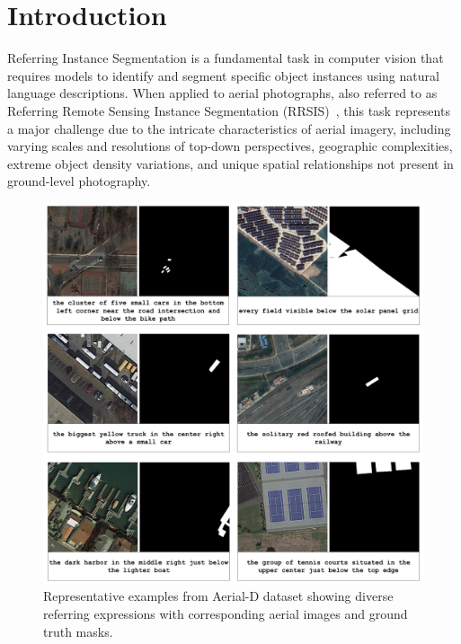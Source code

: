 
\section{Introduction}
\label{sec:intro}

Referring Instance Segmentation is a fundamental task in computer vision that requires models to identify and segment specific object instances using natural language descriptions. When applied to aerial photographs, also referred to as Referring Remote Sensing Instance Segmentation (RRSIS)~\cite{yuan2023rrsis}, this task represents a major challenge due to the intricate characteristics of aerial imagery, including varying scales and resolutions of top-down perspectives, geographic complexities, extreme object density variations, and unique spatial relationships not present in ground-level photography.

\begingroup
\setlength{\intextsep}{6pt}
\setlength{\abovecaptionskip}{2pt}
\setlength{\belowcaptionskip}{0pt}
\begin{figure}[H]
\centering
\includegraphics[width=\columnwidth]{./images/6samples.png}
\caption{Representative examples from Aerial-D dataset showing diverse referring expressions with corresponding aerial images and ground truth masks.}
\label{fig:dataset_examples}
\end{figure}
\endgroup

